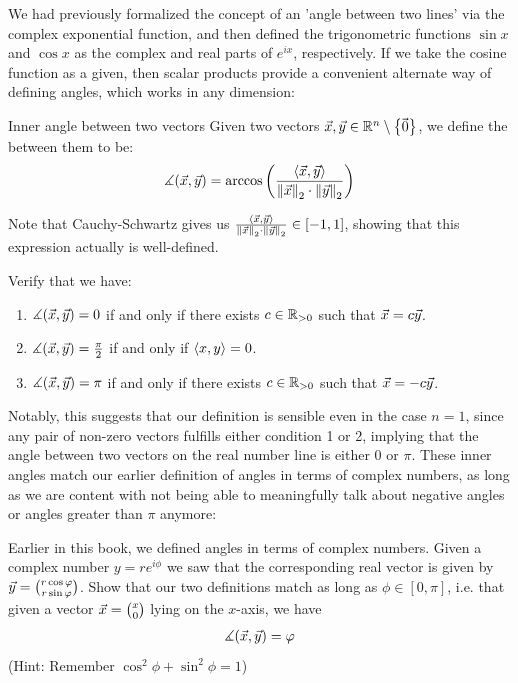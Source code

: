 We had previously formalized the concept of an 'angle between two lines' via the complex exponential function, and then defined the trigonometric functions $\sin x$ and $\cos x$ as the complex and real parts of $e^{ix}$, respectively. If we take the cosine function as a given, then scalar products provide a convenient alternate way of defining angles, which works in any dimension:
\begin{importantdefinition}{Inner angle between two vectors}{}
	Given two vectors $\vec{x},\vec{y} \in \mathbb{R}^n \setminus \qty{\kern-1.2pt\vec{\kern1.2pt 0}}$, we define the  between them to be:
	\begin{align*}
		\measuredangle(\vec{x},\vec{y}) = \arccos \qty( \frac{\left\langle \vec{x}, \vec{y} \right\rangle}{\norm{\vec{x}}_2 \cdot \norm{\vec{y}}_2})
	\end{align*}
\end{importantdefinition}
Note that Cauchy-Schwartz gives us $\frac{\left\langle \vec{x}, \vec{y} \right\rangle}{\norm{\vec{x}}_2 \cdot \norm{\vec{y}}_2} \in [-1,1]$, showing that this expression actually is well-defined.
\begin{exercise}
	Verify that we have:
	\begin{enumerate}
		\item $\measuredangle(\vec{x},\vec{y}) = 0$ if and only if there exists $c \in \mathbb{R}_{> 0}$ such that $\vec{x} = c \vec{y}$.
		\item $\measuredangle(\vec{x},\vec{y}) = \frac{\pi}{2}$ if and only if $\left\langle x, y \right\rangle = 0$.
		\item $\measuredangle(\vec{x},\vec{y}) = \pi$ if and only if there exists $c \in \mathbb{R}_{> 0}$ such that $\vec{x} = -c \vec{y}$.
	\end{enumerate}
\end{exercise}
Notably, this suggests that our definition is sensible even in the case $n = 1$, since any pair of non-zero vectors fulfills either condition 1 or 2, implying that the angle between two vectors on the real number line is either $0$ or $\pi$.
\newpar
These inner angles match our earlier definition of angles in terms of complex numbers, as long as we are content with not being able to meaningfully talk about negative angles or angles greater than $\pi$ anymore:
\begin{exercise}
	Earlier in this book, we defined angles in terms of complex numbers. Given a complex number $y = r e^{i \phi}$ we saw that the corresponding real vector is given by $\vec{y} = \binom{r \cos \varphi}{r \sin \varphi}$. 
	\newpar
	Show that our two definitions match as long as $\phi \in [0, \pi]$, i.e. that given a vector $\vec{x} = \binom{x}{0}$ lying on the $x$-axis, we have
	\begin{align*}
		\measuredangle(\vec{x},\vec{y}) = \varphi
	\end{align*}
	(Hint: Remember $\cos^2 \phi + \sin^2 \phi = 1$)
\end{exercise}
